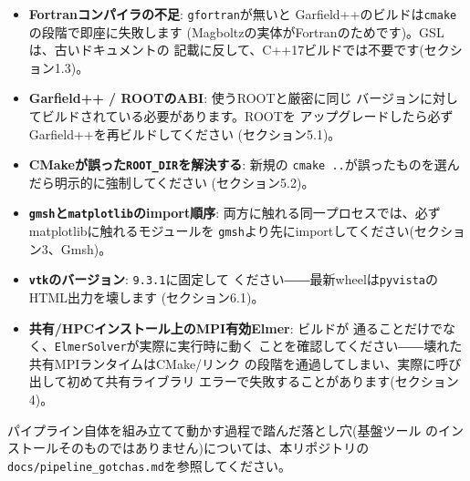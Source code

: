 \documentclass[11pt]{ltjsarticle}
\begin{document}
\begin{itemize}
  \item \textbf{Fortranコンパイラの不足}: \texttt{gfortran}が無いと
    Garfield++のビルドは\texttt{cmake}の段階で即座に失敗します
    (Magboltzの実体がFortranのためです)。GSLは、古いドキュメントの
    記載に反して、C++17ビルドでは不要です(セクション1.3)。
  \item \textbf{Garfield++ / ROOTのABI}: 使うROOTと厳密に同じ
    バージョンに対してビルドされている必要があります。ROOTを
    アップグレードしたら必ずGarfield++を再ビルドしてください
    (セクション5.1)。
  \item \textbf{CMakeが誤った\texttt{ROOT\_DIR}を解決する}: 新規の
    \texttt{cmake ..}が誤ったものを選んだら明示的に強制してください
    (セクション5.2)。
  \item \textbf{\texttt{gmsh}と\texttt{matplotlib}のimport順序}:
    両方に触れる同一プロセスでは、必ずmatplotlibに触れるモジュールを
    \texttt{gmsh}より先にimportしてください(セクション3、Gmsh)。
  \item \textbf{\texttt{vtk}のバージョン}: \texttt{9.3.1}に固定して
    ください――最新wheelは\texttt{pyvista}のHTML出力を壊します
    (セクション6.1)。
  \item \textbf{共有/HPCインストール上のMPI有効Elmer}: ビルドが
    通ることだけでなく、\texttt{ElmerSolver}が実際に実行時に動く
    ことを確認してください――壊れた共有MPIランタイムはCMake/リンク
    の段階を通過してしまい、実際に呼び出して初めて共有ライブラリ
    エラーで失敗することがあります(セクション4)。
\end{itemize}

パイプライン自体を組み立てて動かす過程で踏んだ落とし穴(基盤ツール
のインストールそのものではありません)については、本リポジトリの
\texttt{docs/pipeline\_gotchas.md}を参照してください。
\end{document}
